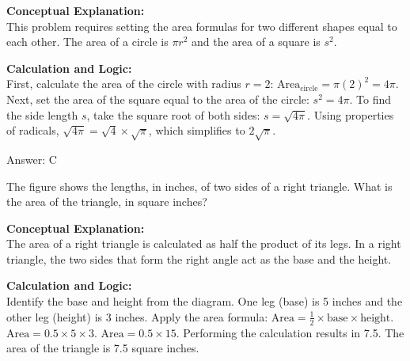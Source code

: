 \documentclass[11pt,paper=a4,answers]{exam}
\begin{document}
\begin{questions}
\begin{solution}
\textbf{Conceptual Explanation:} \\
This problem requires setting the area formulas for two different shapes equal to each other. The area of a circle is $\pi r^2$ and the area of a square is $s^2$.

\vspace{30pt}

\textbf{Calculation and Logic:} \\
First, calculate the area of the circle with radius $r = 2$: $\text{Area}_{\text{circle}} = \pi(2)^2 = 4\pi$. Next, set the area of the square equal to the area of the circle: $s^2 = 4\pi$. To find the side length $s$, take the square root of both sides: $s = \sqrt{4\pi}$. Using properties of radicals, $\sqrt{4\pi} = \sqrt{4} \times \sqrt{\pi}$, which simplifies to $2\sqrt{\pi}$.

\vspace{30pt}

Answer: \colorbox{yellow!100}{C}
\end{solution}

\vspace{60pt}

\question
\begin{center}
\end{center}
The figure shows the lengths, in inches, of two sides of a right triangle. What is the area of the triangle, in square inches?

\begin{solution}
\textbf{Conceptual Explanation:} \\
The area of a right triangle is calculated as half the product of its legs. In a right triangle, the two sides that form the right angle act as the base and the height.

\vspace{30pt}

\textbf{Calculation and Logic:} \\
Identify the base and height from the diagram. One leg (base) is 5 inches and the other leg (height) is 3 inches. Apply the area formula: $\text{Area} = \frac{1}{2} \times \text{base} \times \text{height}$. $\text{Area} = 0.5 \times 5 \times 3$. $\text{Area} = 0.5 \times 15$. Performing the calculation results in 7.5. The area of the triangle is 7.5 square inches.


\end{solution}
\end{questions}
\end{document}
